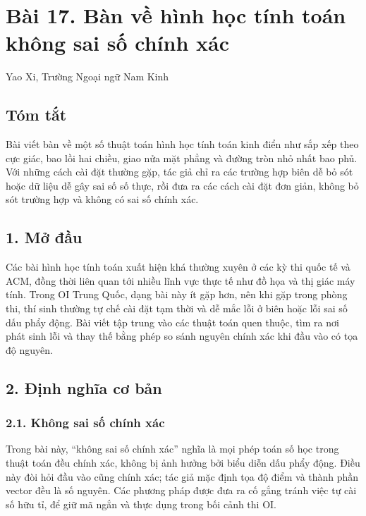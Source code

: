 \documentclass[11pt]{article}
\begin{document}
\section*{Bài 17. Bàn về hình học tính toán không sai số chính xác}

\begin{center}
Yao Xi, Trường Ngoại ngữ Nam Kinh
\end{center}

\subsection*{Tóm tắt}

Bài viết bàn về một số thuật toán hình học tính toán kinh điển như sắp xếp
theo cực giác, bao lồi hai chiều, giao nửa mặt phẳng và đường tròn nhỏ nhất
bao phủ. Với những cách cài đặt thường gặp, tác giả chỉ ra các trường hợp biên
dễ bỏ sót hoặc dữ liệu dễ gây sai số số thực, rồi đưa ra các cách cài đặt đơn
giản, không bỏ sót trường hợp và không có sai số chính xác.

\subsection*{1. Mở đầu}

Các bài hình học tính toán xuất hiện khá thường xuyên ở các kỳ thi quốc tế và
ACM, đồng thời liên quan tới nhiều lĩnh vực thực tế như đồ họa và thị giác máy
tính. Trong OI Trung Quốc, dạng bài này ít gặp hơn, nên khi gặp trong phòng
thi, thí sinh thường tự chế cài đặt tạm thời và dễ mắc lỗi ở biên hoặc lỗi
sai số dấu phẩy động. Bài viết tập trung vào các thuật toán quen thuộc, tìm ra
nơi phát sinh lỗi và thay thế bằng phép so sánh nguyên chính xác khi đầu vào
có tọa độ nguyên.

\subsection*{2. Định nghĩa cơ bản}

\subsubsection*{2.1. Không sai số chính xác}

Trong bài này, ``không sai số chính xác'' nghĩa là mọi phép toán số học trong
thuật toán đều chính xác, không bị ảnh hưởng bởi biểu diễn dấu phẩy động. Điều
này đòi hỏi đầu vào cũng chính xác; tác giả mặc định tọa độ điểm và thành phần
vector đều là số nguyên. Các phương pháp được đưa ra cố gắng tránh việc tự cài
số hữu tỉ, để giữ mã ngắn và thực dụng trong bối cảnh thi OI.
\end{document}
